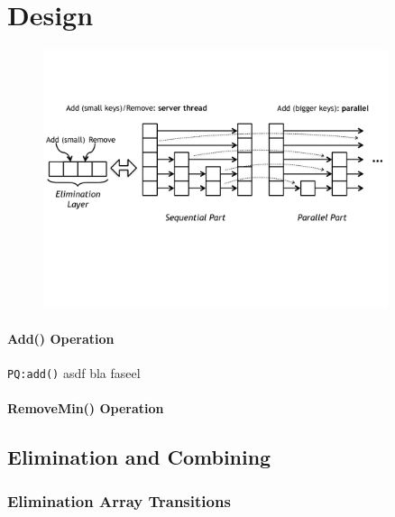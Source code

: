 
\section{Design}



\begin{figure}[htb]
	\centering
	\includegraphics[width=0.9\textwidth]{graphics/pqe.pdf}
	\caption{\cite{calciu_adaptive_2014}}
	\label{fig:pqe}
\end{figure}

\paragraph{Add() Operation}

\texttt{PQ:add()} asdf bla faseel

\paragraph{RemoveMin() Operation}

\subsection{Elimination and Combining}

\subsubsection{Elimination Array Transitions}

